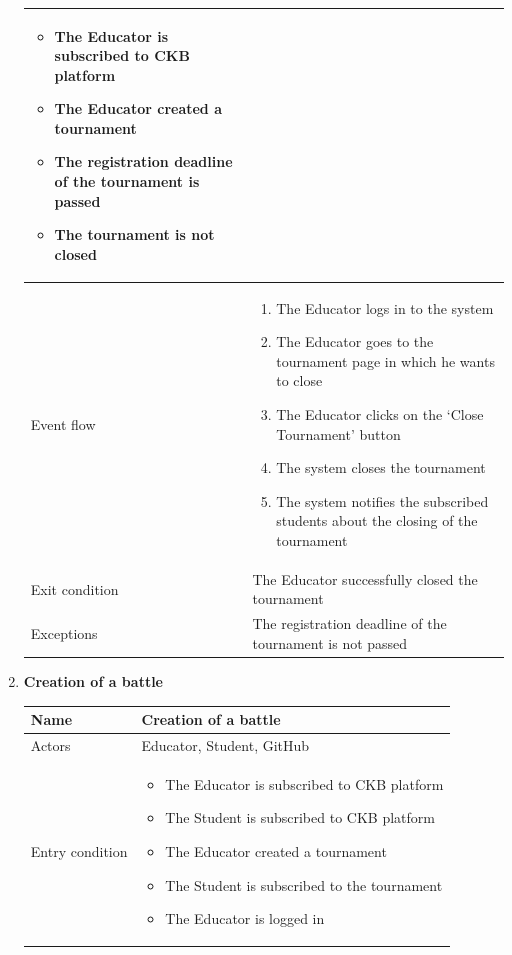 \begin{enumerate}[label=UC\arabic*:]
\begin{tabular}{|p{3cm}|p{8cm}|}
\begin{itemize}
        \item The Educator is subscribed to CKB platform
        \item The Educator created a tournament
        \item The registration deadline of the tournament is passed
        \item The tournament is not closed
    \end{itemize}
    \\
    \hline
    Event flow &
    \begin{enumerate}[label=\arabic*.]
        \item The Educator logs in to the system
        \item The Educator goes to the tournament page in which he wants to close
        \item The Educator clicks on the `Close Tournament' button
        \item The system closes the tournament
        \item The system notifies the subscribed students about the closing of the tournament
    \end{enumerate}
    \\
    \hline
    Exit condition & The Educator successfully closed the tournament \\
    \hline
    Exceptions & The registration deadline of the tournament is not passed \\
    \hline
    \end{tabular}
    \item \textbf{Creation of a battle} \\
    \begin{tabular}{|p{3cm}|p{8cm}|}
        \hline
        Name & Creation of a battle \\
        \hline
        Actors & Educator, Student, GitHub \\
        \hline
        Entry condition &
        \begin{itemize}
            \item The Educator is subscribed to CKB platform
            \item The Student is subscribed to CKB platform
            \item The Educator created a tournament
            \item The Student is subscribed to the tournament
            \item The Educator is logged in
        \end{itemize}
        \\

\end{tabular}
\end{enumerate}
